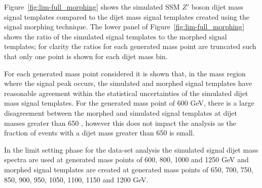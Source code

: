 Figure~\ref{fig:lim-full_morphing} shows the simulated SSM $Z'$ boson dijet mass signal templates
compared to the dijet mass signal templates created using the signal morphing technique.
The lower panel of Figure~\ref{fig:lim-full_morphing} shows the ratio of the simulated signal templates to the morphed signal templates;
for clarity the ratios for each generated mass point are truncated such that only one point is shown for each dijet mass bin.

For each generated mass point considered it is shown that,
in the mass region where the signal peak occurs,
the simulated and morphed signal templates have reasonable agreement within the
statistical uncertainties of the simulated dijet mass signal templates.
For the generated mass point of 600 GeV,
there is a large disagreement between the morphed and simulated signal templates at dijet masses greater than 650 \GeV{},
however this does not impact the analysis as the fraction of events with a dijet mass greater than 650 \GeV{} is small.

In the limit setting phase for the \lm{} data-set analysis
the simulated signal dijet mass spectra are used at generated mass points of 600, 800, 1000 and 1250 GeV and
morphed signal templates are created at generated mass points of 650, 700, 750, 850, 900, 950, 1050, 1100, 1150 and 1200 GeV.

